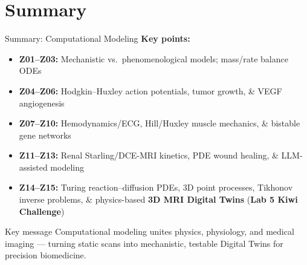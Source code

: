 \documentclass[aspectratio=169, 10pt]{beamer}
\begin{document}
\section*{Summary}

\begin{frame}{Summary: Computational Modeling}
    \textbf{Key points:}
    \begin{itemize}\footnotesize
        \item \textbf{Z01--Z03:} Mechanistic vs.\ phenomenological models; mass/rate balance ODEs
        \item \textbf{Z04--Z06:} Hodgkin--Huxley action potentials, tumor growth, \& VEGF angiogenesis
        \item \textbf{Z07--Z10:} Hemodynamics/ECG, Hill/Huxley muscle mechanics, \& bistable gene networks
        \item \textbf{Z11--Z13:} Renal Starling/DCE-MRI kinetics, PDE wound healing, \& LLM-assisted modeling
        \item \textbf{Z14--Z15:} Turing reaction--diffusion PDEs, 3D point processes, Tikhonov inverse problems, \& physics-based \textbf{3D MRI Digital Twins} (\textbf{Lab 5 Kiwi Challenge})
    \end{itemize}

    \vspace{0.15cm}
    \begin{block}{\footnotesize Key message}
        \footnotesize Computational modeling unites physics, physiology, and medical imaging --- turning static scans into mechanistic, testable Digital Twins for precision biomedicine.
    \end{block}
\end{frame}
\end{document}
